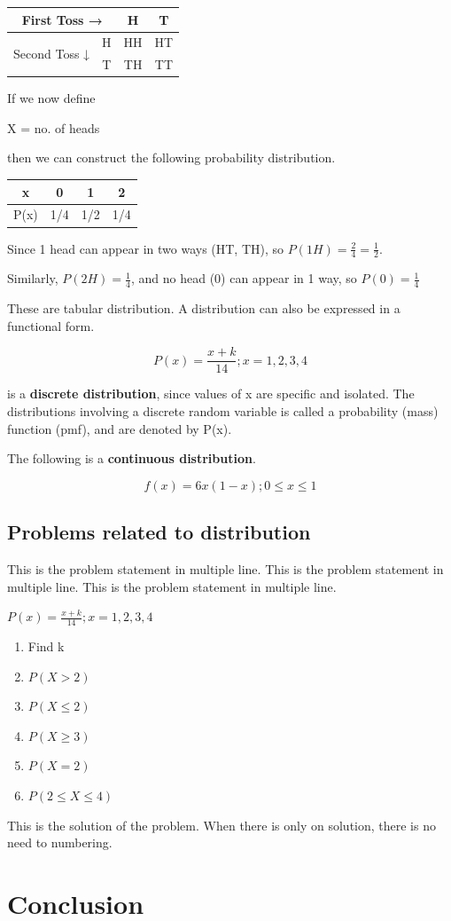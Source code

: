 \documentclass[14pt, a4paper,oneside, margin=1.4in]{book}
\begin{document}
\begin{table}[h]
\centering
\begin{tabular}{c|c|c|c}
\multicolumn{2}{c}{First Toss →}   & H  & T  \\ \hline
\multirow{2}{*}{Second Toss ↓} & H & HH & HT \\ 
                               & T & TH & TT
\end{tabular}
\end{table}

If we now define

X =  no. of heads

then we can construct the following probability distribution.
\begin{table}[h]
\centering
\begin{tabular}{c|c|c|c}
x    & 0   & 1   & 2   \\ \hline
P(x) & 1/4 & 1/2 & 1/4
\end{tabular}
\end{table}

Since 1 head can appear in two ways (HT, TH), so $P(1H)=\frac24=\frac12$.

Similarly, $P(2H)=\frac14$, and no head (0) can appear in 1 way, so $P(0) = \frac14$

These are tabular distribution. A distribution can also be expressed in a functional form. 

$$P(x) = \frac{x+k}{14}; x= 1,2,3,4$$

is a \textbf{discrete distribution}, since values of x are specific and isolated. The distributions involving a discrete random variable is called a probability (mass) function (pmf), and are denoted by P(x).

The following is a \textbf{continuous distribution}. 

\[f(x) = 6x(1-x); 0\le x\le 1\]

\section{Problems related to distribution}

\Problem This is the problem statement in multiple line. This is the
problem statement in multiple line. This is the problem statement in
multiple line.

$P(x) = \frac{x+k}{14}; x= 1,2,3,4$

\begin{enumerate}
  \item Find k
  \item $P(X>2)$
  \item $P(X \le 2)$
  \item $P(X \ge 3)$
  \item $P(X=2)$
  \item $P(2 \le X \le 4)$
\end{enumerate}

\TheSolution This is the solution of the problem. When there is only on
solution, there is no need to numbering.

\backmatter
\chapter{Conclusion}
\lipsum[8]

\tableofcontents
\end{document}
